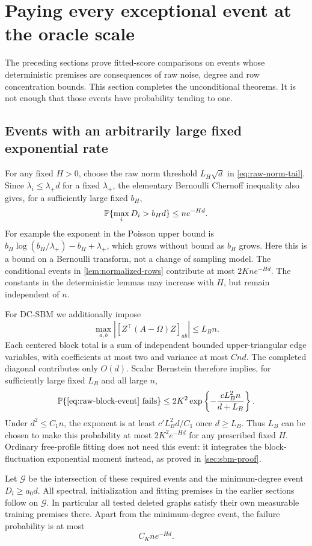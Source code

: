 \section{Paying every exceptional event at the oracle scale}
\label{sec:probability}

The preceding sections prove fitted-score comparisons on events whose
deterministic premises are consequences of raw noise, degree and row
concentration bounds. This section completes the unconditional theorems.
It is not enough that those events have probability tending to one.

\subsection{Events with an arbitrarily large fixed exponential rate}

For any fixed $H>0$, choose the raw norm threshold $L_H\sqrt d$ in
\eqref{eq:raw-norm-tail}. Since $\lambda_i\le\lambda_+d$ for a fixed
$\lambda_+$, the elementary Bernoulli Chernoff inequality also gives,
for a sufficiently large fixed $b_H$,
\[
 \mathbb P\{\max_iD_i>b_Hd\}\le ne^{-Hd}.
\]
For example the exponent in the Poisson upper bound is
$b_H\log(b_H/\lambda_+)-b_H+\lambda_+$, which grows without bound as
$b_H$ grows. Here this is a bound on a Bernoulli transform, not a change
of sampling model.
The conditional events in \cref{lem:normalized-rows} contribute at most
$2Kn e^{-Hd}$. The constants in the deterministic lemmas may increase
with $H$, but remain independent of $n$.

For DC-SBM we additionally impose
\begin{equation}\label{eq:raw-block-event}
 \max_{a,b}|[Z^\top(A-\Omega)Z]_{ab}|\le L_Bn.
\end{equation}
Each centered block total is a sum of independent bounded upper-triangular
edge variables, with coefficients at most two and variance at most $Cnd$.
The completed diagonal contributes only $O(d)$.
Scalar Bernstein therefore implies, for sufficiently large fixed $L_B$
and all large $n$,
\[
 \mathbb P\{\eqref{eq:raw-block-event}\text{ fails}\}
 \le 2K^2\exp\left\{-\frac{cL_B^2 n}{d+L_B}\right\}.
\]
Under $d^2\le C_1n$, the exponent is at least
$c'L_B^2d/C_1$ once $d\ge L_B$. Thus $L_B$ can be chosen to make this
probability at most $2K^2e^{-Hd}$ for any prescribed fixed $H$.
Ordinary free-profile fitting does not need this event: it integrates the
block-fluctuation exponential moment instead, as proved in
\cref{sec:sbm-proof}.

Let $\mathcal G$ be the intersection of these required events and the
minimum-degree event $D_i\ge a_0d$. All spectral, initialization and fitting
premises in the earlier sections follow on $\mathcal G$.
In particular all tested deleted graphs satisfy their own measurable
training premises there. Apart from the minimum-degree event, the failure
probability is at most
\begin{equation}\label{eq:other-bad-events}
 C_Kne^{-Hd}.
\end{equation}

